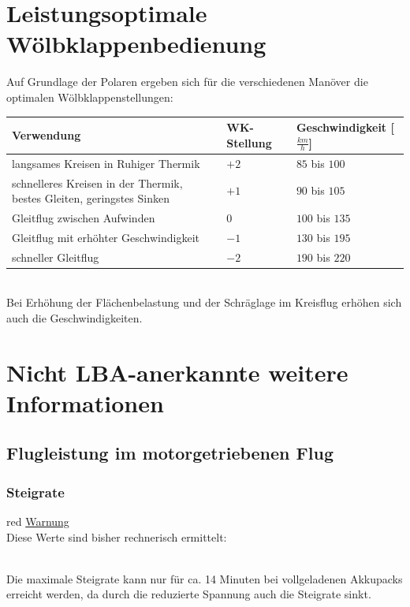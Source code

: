 \section{Leistungsoptimale Wölbklappenbedienung}
Auf Grundlage der Polaren ergeben sich für die verschiedenen Manöver die optimalen Wölbklappenstellungen:\\
\newline
\begin{tabular}{|m{}|m{2cm}|m{4cm}|}
\hline
Verwendung & WK-Stellung & Geschwindigkeit [$\frac{km}{h}$]\\
\hline
langsames Kreisen in Ruhiger Thermik & $+2$ & $85$ bis $100$\\
\hline
schnelleres Kreisen in der Thermik, bestes Gleiten, geringstes Sinken & $+1$ & $90$ bis $105$\\
\hline
Gleitflug zwischen Aufwinden & $0$ & $100$ bis $135$\\
\hline
Gleitflug mit erhöhter Geschwindigkeit & $-1$ & $130$ bis $195$\\
\hline
schneller Gleitflug & $-2$ & $190$ bis $220$\\
\hline
\end{tabular}\\
\newline
\newline
Bei Erhöhung der Flächenbelastung und der Schräglage im Kreisflug erhöhen sich auch die Geschwindigkeiten.

\section{Nicht LBA-anerkannte weitere Informationen}
\subsection{Flugleistung im motorgetriebenen Flug}
\subsubsection{Steigrate}

\begin{color}{red}
\large{\underline{Warnung}}\\
Diese Werte sind bisher rechnerisch ermittelt:
\end{color}\\

Die maximale Steigrate kann nur für ca. 14 Minuten bei vollgeladenen Akkupacks erreicht werden, da durch die reduzierte Spannung auch die Steigrate sinkt.

